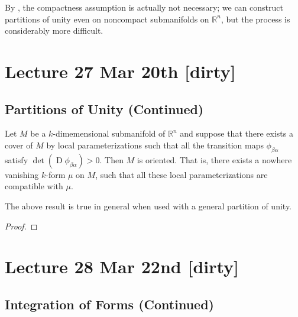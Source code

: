 \documentclass[notoc,notitlepage]{tufte-book}
\DeclareMathOperator{\D}{D}
\begin{document}
\begin{remark}
  By \citet{karigiannis2019}, the compactness assumption is actually not
  necessary; we can construct partitions of unity even on noncompact
  submanifolds on $\mathbb{R}^n$, but the process is considerably more
  difficult.
\end{remark}



\chapter{Lecture 27 Mar 20th [dirty]}%
\label{chp:lecture_27_mar_20th}

\section{Partitions of Unity (Continued)}%
\label{sec:partitions_of_unity_continued}

\begin{propo}
  Let $M$ be a $k$-dimemensional submanifold of $\mathbb{R}^n$ and suppose that
  there exists a cover of $M$ by local parameterizations such that all the
  transition maps $\phi_{\beta \alpha}$ satisfy $\det (\D \phi_{ \beta \alpha }) >
  0$. Then $M$ is oriented. That is, there exists a nowhere vanishing $k$-form
  $\mu$ on $M$, such that all these local parameterizations are compatible with
  $\mu$.
\end{propo}

\begin{note}
  The above result is true in general when used with a general partition of
  unity.
\end{note}

\begin{proof}
  
\end{proof}



\chapter{Lecture 28 Mar 22nd [dirty]}%
\label{chp:lecture_28_mar_22nd}

\section{Integration of Forms (Continued)}%
\label{sec:integration_of_forms_continued}
\end{document}
